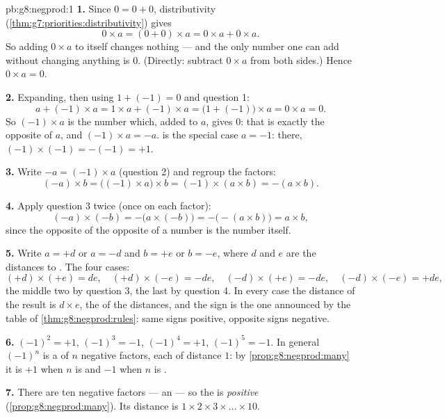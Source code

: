 \begin{solution}{pb:g8:negprod:1}
\textbf{1.} Since $0 = 0 + 0$, distributivity
(\cref{thm:g7:priorities:distributivity}) gives
\[
0 \times a = (0 + 0) \times a = 0 \times a + 0 \times a .
\]
So adding $0 \times a$ to itself changes nothing --- and the only
number one can add without changing anything is $0$. (Directly:
subtract $0 \times a$ from both sides.) Hence $0 \times a = 0$.

\textbf{2.} Expanding, then using $1 + (-1) = 0$ and question 1:
\[
a + (-1) \times a
= 1 \times a + (-1) \times a
= \bigl(1 + (-1)\bigr) \times a
= 0 \times a = 0 .
\]
So $(-1) \times a$ is the number which, added to $a$, gives $0$:
that is exactly the opposite of $a$, and $(-1) \times a = -a$.
 is the special case $a = -1$: there,
$(-1) \times (-1) = -(-1) = +1$.

\textbf{3.} Write $-a = (-1) \times a$ (question 2) and regroup the
factors:
\[
(-a) \times b
= \bigl((-1) \times a\bigr) \times b
= (-1) \times (a \times b)
= -(a \times b) .
\]

\textbf{4.} Apply question 3 twice (once on each factor):
\[
(-a) \times (-b)
= -\bigl(a \times (-b)\bigr)
= -\bigl(-(a \times b)\bigr)
= a \times b ,
\]
since the opposite of the opposite of a number is the number itself.

\textbf{5.} Write $a = +d$ or $a = -d$ and $b = +e$ or $b = -e$,
where $d$ and $e$ are the distances to . The four cases:
\[
(+d) \times (+e) = de, \quad
(+d) \times (-e) = -de, \quad
(-d) \times (+e) = -de, \quad
(-d) \times (-e) = +de,
\]
the middle two by question 3, the last by question 4. In every case
the distance of the result is $d \times e$, the  of the
distances, and the sign is the one announced by the table of
\cref{thm:g8:negprod:rules}: same signs positive, opposite signs
negative.

\textbf{6.} $(-1)^2 = +1$, $(-1)^3 = -1$, $(-1)^4 = +1$,
$(-1)^5 = -1$. In general $(-1)^n$ is a  of $n$ negative
factors, each of distance $1$: by \cref{prop:g8:negprod:many} it is
$+1$ when $n$ is  and $-1$ when $n$ is .

\textbf{7.} There are ten negative factors --- an  --- so
the  is \emph{positive} (\cref{prop:g8:negprod:many}). Its
distance is $1 \times 2 \times 3 \times \dots \times 10$.


\end{solution}

